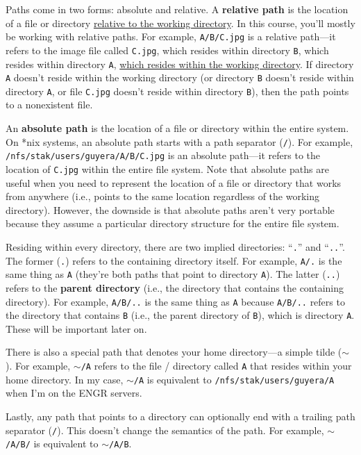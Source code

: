 \documentclass{article}
\begin{document}
Paths come in two forms: absolute and relative. A \textbf{relative path} is the location of a file or directory \underline{relative to the working directory}. In this course, you'll mostly be working with relative paths. For example, \texttt{A/B/C.jpg} is a relative path---it refers to the image file called \texttt{C.jpg}, which resides within directory \texttt{B}, which resides within directory \texttt{A}, \underline{which resides within the working directory}. If directory \texttt{A} doesn't reside within the working directory (or directory \texttt{B} doesn't reside within directory \texttt{A}, or file \texttt{C.jpg} doesn't reside within directory \texttt{B}), then the path points to a nonexistent file.

An \textbf{absolute path} is the location of a file or directory within the entire system. On *nix systems, an absolute path starts with a path separator (\texttt{/}). For example, \texttt{/nfs/stak/users/guyera/A/B/C.jpg} is an absolute path---it refers to the location of \texttt{C.jpg} within the entire file system. Note that absolute paths are useful when you need to represent the location of a file or directory that works from anywhere (i.e., points to the same location regardless of the working directory). However, the downside is that absolute paths aren't very portable because they assume a particular directory structure for the entire file system.

Residing within every directory, there are two implied directories: ``\texttt{.}'' and ``\texttt{..}''. The former (\texttt{.}) refers to the containing directory itself. For example, \texttt{A/.} is the same thing as \texttt{A} (they're both paths that point to directory \texttt{A}). The latter (\texttt{..}) refers to the \textbf{parent directory} (i.e., the directory that contains the containing directory). For example, \texttt{A/B/..} is the same thing as \texttt{A} because \texttt{A/B/..} refers to the directory that contains \texttt{B} (i.e., the parent directory of \texttt{B}), which is directory \texttt{A}. These will be important later on.

There is also a special path that denotes your home directory---a simple tilde ($\sim$). For example, \texttt{$\sim$/A} refers to the file / directory called \texttt{A} that resides within your home directory. In my case, \texttt{$\sim$/A} is equivalent to \texttt{/nfs/stak/users/guyera/A} when I'm on the ENGR servers.

Lastly, any path that points to a directory can optionally end with a trailing path separator (\texttt{/}). This doesn't change the semantics of the path. For example, \texttt{$\sim$/A/B/} is equivalent to \texttt{$\sim$/A/B}.
\end{document}

